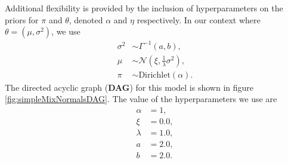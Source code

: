 \documentclass[]{article}
\begin{document}
Additional flexibility is provided by the inclusion of hyperparameters on the priors for $\pi$ and $\theta$, denoted $\alpha$ and $\eta$ respectively. In our context where $\theta=(\mu, \sigma^2)$, we use
\begin{align}
	\sigma^2 &\sim \Gamma^{-1}(a, b), \\
	\mu &\sim \mathcal{N}(\xi, \frac{1}{\lambda} \sigma^2), \\
	\pi &\sim \textrm{Dirichlet}(\alpha).
\end{align}
The directed acyclic graph (\textbf{DAG}) for this model is shown in figure \ref{fig:simpleMixNormalsDAG}. The value of the hyperparameters we use are
\begin{align}
	\alpha &= 1, \\
	\xi &= 0.0, \\
	\lambda &= 1.0,\\
	a &= 2.0,\\
	b &= 2.0.
\end{align}
\end{document}
